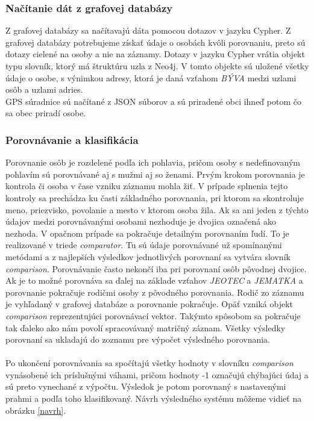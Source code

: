 \subsubsection{Načítanie dát z grafovej databázy}
Z grafovej databázy sa načítavajú dáta pomocou dotazov v jazyku Cypher. Z grafovej
databázy potrebujeme získať údaje o osobách kvôli porovnaniu, preto sú dotazy cielené na
osoby a nie na záznamy. Dotazy v jazyku Cypher vrátia objekt typu slovník, ktorý má štruktúru uzla z Neo4j. V tomto objekte sú uložené všetky údaje o osobe,
s výnimkou adresy, ktorá je daná vzťahom \textit{BÝVA} medzi uzlami osôb a uzlami adries.\\
GPS súradnice sú načítané z JSON súborov a sú priradené obci ihneď potom čo sa obec
priradí osobe.

\subsubsection{Porovnávanie a klasifikácia}
Porovnanie osôb je rozdelené podľa ich pohlavia, pričom osoby s nedefinovaným pohlavím
sú porovnávané aj s mužmi aj so ženami. Prvým krokom porovnania je kontrola či osoba
v čase vzniku záznamu mohla žiť. V prípade splnenia tejto kontroly sa prechádza ku časti
základného porovnania, pri ktorom sa skontroluje meno, priezvisko, povolanie a mesto
v ktorom osoba žila. Ak sa ani jeden z týchto údajov medzi porovnávanými osobami
nezhoduje je dvojica označená ako nezhoda. V opačnom prípade sa pokračuje detailným
porovnaním ľudí. To je realizované v triede \textit{comparator}. Tu sú údaje porovnávané už
spomínanými metódami a z najlepších výsledkov jednotlivých porovnaní sa vytvára slovník \textit{comparison}. Porovnávanie často nekončí iba pri porovnaní osôb pôvodnej dvojice. Ak je to
možné porovnáva sa ďalej na základe vzťahov \textit{JE\textunderscore OTEC} a \textit{JE\textunderscore MATKA} a porovnanie
pokračuje rodičmi osoby z pôvodného porovnania. Rodič zo záznamu je vyhľadaný
v grafovej databáze a porovnanie pokračuje. Opäť vzniká objekt \textit{comparison} reprezentujúci
porovnávací vektor. Takýmto spôsobom sa pokračuje tak ďaleko ako nám povolí
spracovávaný matričný záznam. Všetky výsledky porovnaní sa ukladajú do zoznamu pre
výpočet     výsledného porovnania.\\\\
Po ukončení porovnávania sa spočítajú všetky hodnoty v slovníku \textit{comparison} vynásobené
ich príslušnými váhami, pričom hodnoty -1 označujú chýbajúci údaj a sú preto vynechané
z výpočtu. Výsledok je potom porovnaný s nastavenými prahmi a podľa toho klasifikovaný.
Návrh výsledného systému môžeme vidieť na obrázku \ref{navrh}.

